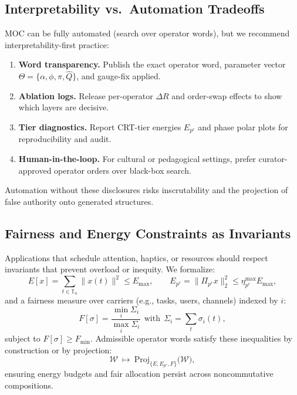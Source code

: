 \documentclass[12pt]{article}
\numberwithin{equation}{section}
\theoremstyle{plain}
\theoremstyle{definition}
\theoremstyle{remark}
\begin{document}
\subsection*{Interpretability vs.\ Automation Tradeoffs}
MOC can be fully automated (search over operator words), but we recommend interpretability-first practice:
\begin{enumerate}
  \item \textbf{Word transparency.} Publish the exact operator word, parameter vector \(\Theta=\{\alpha,\phi,\pi,\hat{Q}\}\), and gauge-fix applied.
  \item \textbf{Ablation logs.} Release per-operator \(\Delta R\) and order-swap effects to show which layers are decisive.
  \item \textbf{Tier diagnostics.} Report CRT-tier energies \(E_{p^r}\) and phase polar plots for reproducibility and audit.
  \item \textbf{Human-in-the-loop.} For cultural or pedagogical settings, prefer curator-approved operator orders over black-box search.
\end{enumerate}
Automation without these disclosures risks inscrutability and the projection of false authority onto generated structures.

\subsection*{Fairness and Energy Constraints as Invariants}
Applications that schedule attention, haptics, or resources should respect invariants that prevent overload or inequity. We formalize:
\[
E[x]=\sum_{t\in\mathbb{T}_n}\|x(t)\|^2 \le E_{\max},\qquad
E_{p^r}=\|\Pi_{p^r}x\|_2^2 \le \eta_{p^r}^{\max}E_{\max},
\]
and a fairness measure over carriers (e.g., tasks, users, channels) indexed by \(i\):
\[
F[\sigma]=\frac{\min_i \Sigma_i}{\max_i \Sigma_i}\ \ \text{with}\ \ \Sigma_i=\sum_{t}\sigma_i(t),
\]
subject to \(F[\sigma]\ge F_{\min}\). Admissible operator words satisfy these inequalities by construction or by projection:
\[
\mathcal{W}\ \mapsto\ \mathrm{Proj}_{\{E,E_{p^r},F\}}\big(\mathcal{W}\big),
\]
ensuring energy budgets and fair allocation persist across noncommutative compositions.
\end{document}
